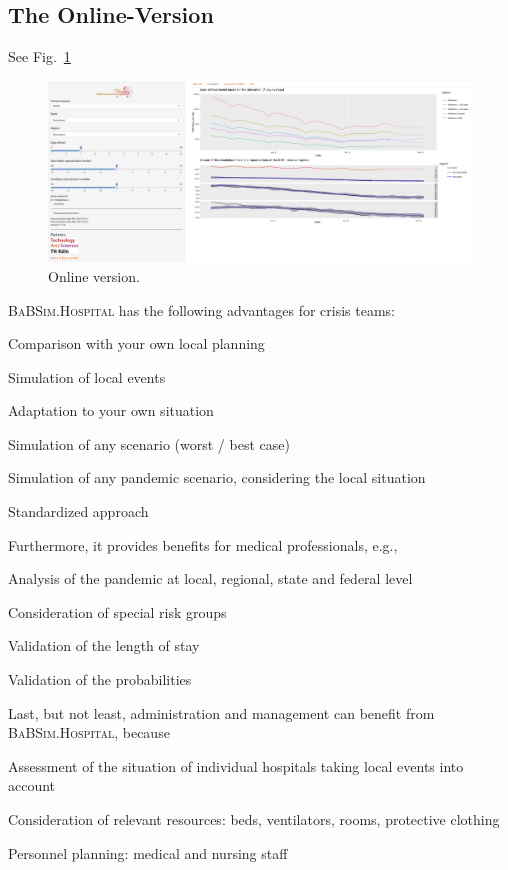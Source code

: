 \documentclass[conference]{IEEEtran}
\newcommand{\babsimhospital}{\textsc{BaBSim.Hospital}\xspace}
\begin{document}
\subsection{The Online-Version}\label{sec:online}

See Fig.~\ref{fig:demo}

\begin{figure}
    \centering
    \includegraphics[width=\linewidth]{demo.png}
    \caption{Online version. }
\label{fig:demo}
\end{figure}

\babsimhospital has the following advantages for crisis teams:
\begin{compactitem}
\item Comparison with your own local planning
\item Simulation of local events
\item Adaptation to your own situation
\item Simulation of any scenario (worst / best case)
\item Simulation of any pandemic scenario, considering the local situation
\item Standardized approach 
\end{compactitem}
Furthermore, it provides benefits for medical professionals, e.g.,
\begin{compactitem}
\item Analysis of the pandemic at local, regional, state and federal level
\item Consideration of special risk groups
\item Validation of the length of stay
\item Validation of the probabilities
\end{compactitem}

Last, but not least, administration and management can benefit from \babsimhospital, because
\begin{compactitem}
\item Assessment of the situation of individual hospitals taking local events into account
\item Consideration of relevant resources: beds, ventilators, rooms, protective clothing
\item Personnel planning: medical and nursing staff
\end{compactitem}
\end{document}
